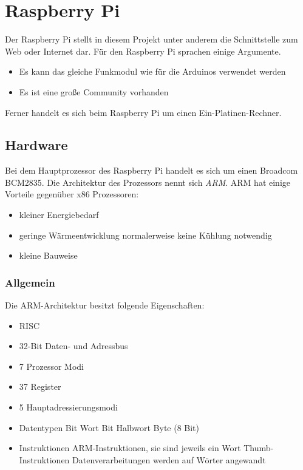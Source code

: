 \section{Raspberry Pi}
Der Raspberry Pi stellt in diesem Projekt unter anderem die Schnittstelle zum Web oder Internet dar. Für den Raspberry Pi sprachen einige Argumente.
\begin{itemize}
\item Es kann das gleiche Funkmodul wie für die Arduinos verwendet werden
\item Es ist eine große Community vorhanden
\end{itemize}
Ferner handelt es sich beim Raspberry Pi um einen Ein-Platinen-Rechner. 

\subsection{Hardware}
Bei dem Hauptprozessor des Raspberry Pi handelt es sich um einen Broadcom BCM2835. Die Architektur des Prozessors nennt sich \textit{ARM}. ARM hat einige Vorteile gegenüber x86 Prozessoren: 
\begin{itemize}
\item kleiner Energiebedarf
\item geringe Wärmeentwicklung
\subitem normalerweise keine Kühlung notwendig
\item kleine Bauweise
\end{itemize}

\subsubsection{Allgemein}
Die ARM-Architektur besitzt folgende Eigenschaften: 
\begin{itemize}
\item \ac{RISC}
\item 32-Bit Daten- und Adressbus
\item 7 Prozessor Modi
\item 37 Register
\item 5 Hauptadressierungsmodi
\item Datentypen
 Bit Wort
 Bit Halbwort
\subitem Byte (8 Bit)
\item Instruktionen
 ARM-Instruktionen, sie sind jeweils ein Wort
 Thumb-Instruktionen
\subitem Datenverarbeitungen werden auf Wörter angewandt
\end{itemize}

